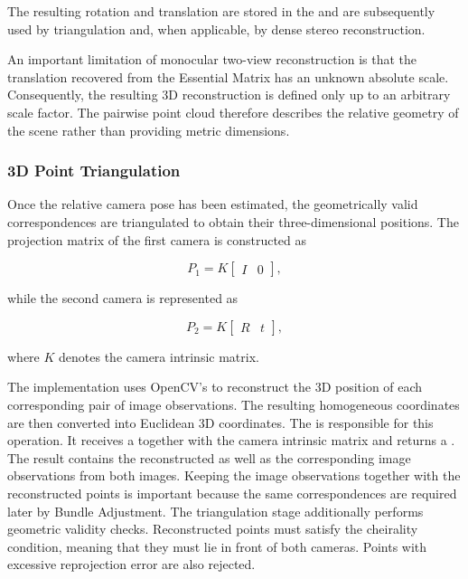 The resulting rotation and translation are stored in the
 and are subsequently used by triangulation and, when
applicable, by dense stereo reconstruction.

An important limitation of monocular two-view reconstruction is that the
translation recovered from the Essential Matrix has an unknown absolute
scale. Consequently, the resulting 3D reconstruction is defined only up to
an arbitrary scale factor. The pairwise point cloud therefore describes the
relative geometry of the scene rather than providing metric dimensions.

\subsubsection{3D Point Triangulation}

Once the relative camera pose has been estimated, the geometrically valid
correspondences are triangulated to obtain their three-dimensional positions.
The projection matrix of the first camera is constructed as

\begin{equation}
P_1 = K
\begin{bmatrix}
I & 0
\end{bmatrix},
\end{equation}

while the second camera is represented as

\begin{equation}
P_2 = K
\begin{bmatrix}
R & t
\end{bmatrix},
\end{equation}

where $K$ denotes the camera intrinsic matrix.

The implementation uses OpenCV's
 to reconstruct the 3D position of each
corresponding pair of image observations. The resulting homogeneous
coordinates are then converted into Euclidean 3D coordinates.
The  is responsible for this operation. It receives a
 together with the camera intrinsic matrix and returns a
.
The result contains the reconstructed  as well as the
corresponding image observations from both images. Keeping the image
observations together with the reconstructed points is important because the
same correspondences are required later by Bundle Adjustment.
The triangulation stage additionally performs geometric validity checks.
Reconstructed points must satisfy the cheirality condition, meaning that they
must lie in front of both cameras. Points with excessive reprojection error
are also rejected.

